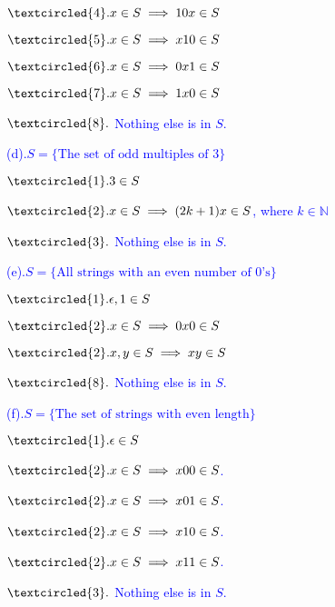 \documentclass{article}
\begin{document}
\begin{addmargin}[2em]{2em}
	\textcolor{blue}{
		$\textcircled{4}. x \in S \implies 10x \in S$
	}
	
	\textcolor{blue}{
		$\textcircled{5}. x \in S \implies x10 \in S$
	}
	
	\textcolor{blue}{
		$\textcircled{6}. x \in S \implies 0x1 \in S$
	}

	\textcolor{blue}{
		$\textcircled{7}. x \in S \implies 1x0 \in S$
	}

	\textcolor{blue}{
		$\textcircled{8}.$ Nothing else is in $S$.\\
	}
	
	\noindent
	\textcolor{blue}{
		(d).$S = \{\text{The set of odd multiples of 3}\}$
	}
	
	\textcolor{blue}{
		$\textcircled{1}. 3 \in S$
	}
	
	\textcolor{blue}{
		$\textcircled{2}. x \in S \implies (2k+1)x  \in S$, where $k \in \mathbb{N}$
	}
	
	\textcolor{blue}{
		$\textcircled{3}.$ Nothing else is in $S$.\\
	}
	
	\noindent
	\textcolor{blue}{
		(e).$S = \{\text{All strings with an even number of 0's}\}$
	}
	
	\textcolor{blue}{
		$\textcircled{1}. \epsilon,1 \in S$
	}
	
	\textcolor{blue}{
		$\textcircled{2}. x \in S \implies 0x0 \in S$
	}
	
	\textcolor{blue}{
		$\textcircled{2}. x,y \in S \implies xy \in S$
	}

	\textcolor{blue}{
		$\textcircled{8}.$ Nothing else is in $S$.\\
	}
	
	\noindent
	\textcolor{blue}{
		(f).$S = \{\text{The set of strings with even length}\}$
	}
	
	\textcolor{blue}{
		$\textcircled{1}. \epsilon \in S$
	}
	
	\textcolor{blue}{
		$\textcircled{2}. x \in S \implies x00 \in S$.
	}
	
	\textcolor{blue}{
		$\textcircled{2}. x \in S \implies x01 \in S$.
	}
	
	\textcolor{blue}{
		$\textcircled{2}. x \in S \implies x10 \in S$.
	}
	
	\textcolor{blue}{
		$\textcircled{2}. x \in S \implies x11 \in S$.
	}

	\textcolor{blue}{
		$\textcircled{3}.$ Nothing else is in $S$.\\
	}
\end{addmargin}
\end{document}
